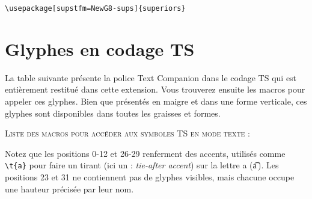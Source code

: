 \documentclass[12pt,english,french]{article}
\begin{document}
\begin{verbatim}
\usepackage[supstfm=NewG8-sups]{superiors}
\end{verbatim}


\section{Glyphes en codage TS}


La table suivante présente la police Text Companion dans le codage TS qui est entièrement restitué dans cette extension. Vous trouverez ensuite les macros pour appeler ces glyphes. Bien que présentés en maigre et dans une forme verticale, ces glyphes sont disponibles dans toutes les graisses et formes.



\textsc{Liste des macros pour accéder aux symboles TS en mode texte} :

Notez que les positions 0-12 et 26-29 renferment des accents, utilisés comme \verb+\t{a}+ pour faire un tirant (ici un : \emph{tie-after accent}) sur la lettre a (\t{a}\,). Les positions 23 et 31 ne contiennent pas de glyphes visibles, mais chacune occupe une hauteur précisée par leur nom. 
\end{document}

